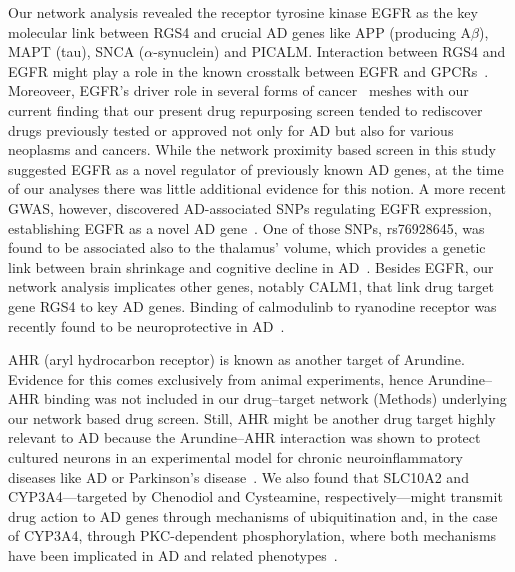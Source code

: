 \documentclass[letterpaper]{article}
\begin{document}
Our network analysis revealed the receptor tyrosine kinase EGFR as the key
molecular link between RGS4 and crucial AD genes like APP (producing
A$\beta$), MAPT (tau), SNCA ($\alpha$-synuclein) and PICALM.
Interaction between RGS4 and EGFR might play a role in the known crosstalk
between EGFR and GPCRs~\cite{Wang2016c}.  Moreoveer, EGFR's driver role in
several forms of cancer~\cite{Sigismund2018} meshes with our current finding
that our present drug repurposing screen tended to rediscover drugs previously
tested or approved not only for AD but also for various neoplasms and cancers.
While the network proximity based screen in this study suggested EGFR as a
novel regulator of previously known AD genes, at the time of our analyses
there was little additional evidence for this notion.  A more recent GWAS,
however, discovered AD-associated SNPs regulating EGFR expression,
establishing EGFR as a novel AD gene~\cite{Bellenguez2022}.  One of those
SNPs, rs76928645, was found to be associated also to the thalamus' volume,
which provides a genetic link between brain shrinkage and cognitive decline in
AD~\cite{Elvsaashagen2021}.  Besides EGFR, our network analysis implicates
other genes, notably CALM1, that link drug target gene RGS4 to key AD genes.
Binding of calmodulinb to ryanodine receptor was recently found to be
neuroprotective in AD~\cite{Nakamura2021}.

AHR (aryl hydrocarbon receptor) is known as another target of Arundine.
Evidence for this comes exclusively from animal experiments, hence
Arundine--AHR binding was not included in our drug--target network (Methods)
underlying our network based drug screen.  Still, AHR might be another drug
target highly relevant to AD because the Arundine--AHR interaction was shown
to protect cultured neurons in an experimental model for chronic
neuroinflammatory diseases like AD or Parkinson's
disease~\cite{Rzemieniec2019}.  We also found that SLC10A2 and
CYP3A4---targeted by Chenodiol and Cysteamine, respectively---might transmit
drug action to AD genes through mechanisms of ubiquitination and, in the case
of CYP3A4, through PKC-dependent phosphorylation, where both mechanisms have
been implicated in AD and related
phenotypes~\cite{Reis2022,Hegde2019,Alfonso2016}.
\end{document}
